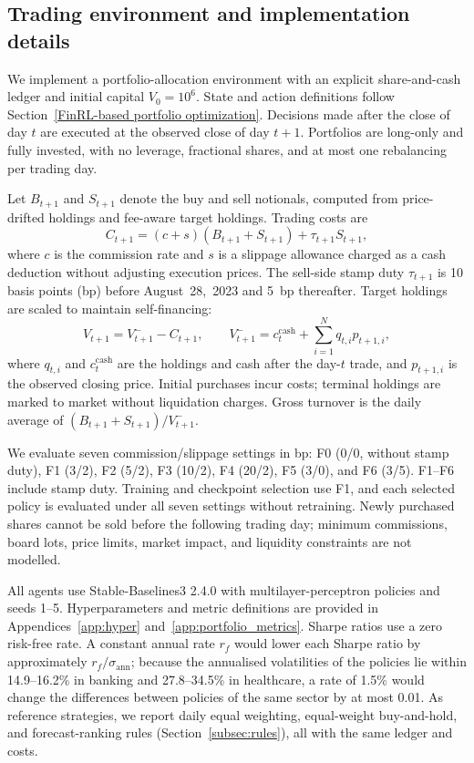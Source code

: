 \documentclass[pdflatex,sn-mathphys-num]{sn-jnl}%
\theoremstyle{thmstyleone}%
\theoremstyle{thmstyletwo}%
\theoremstyle{thmstylethree}%
\begin{document}
\subsection{Trading environment and implementation details}
\label{subsec:env}
{\color{blue}
We implement a portfolio-allocation environment with an explicit share-and-cash ledger and initial capital $V_0=10^6$. State and action definitions follow Section~\ref{FinRL-based portfolio optimization}. Decisions made after the close of day $t$ are executed at the observed close of day $t+1$. Portfolios are long-only and fully invested, with no leverage, fractional shares, and at most one rebalancing per trading day.

Let $B_{t+1}$ and $S_{t+1}$ denote the buy and sell notionals, computed from price-drifted holdings and fee-aware target holdings. Trading costs are
\begin{equation}
C_{t+1}=(c+s)(B_{t+1}+S_{t+1})+\tau_{t+1}S_{t+1},
\label{eq:trading_cost}
\end{equation}
where $c$ is the commission rate and $s$ is a slippage allowance charged as a cash deduction without adjusting execution prices. The sell-side stamp duty $\tau_{t+1}$ is 10 basis points (bp) before August~28,~2023 and 5~bp thereafter. Target holdings are scaled to maintain self-financing:
\begin{equation}
V_{t+1}=V^{-}_{t+1}-C_{t+1},
\qquad
V^{-}_{t+1}=c^{\mathrm{cash}}_t+\sum_{i=1}^{N}q_{t,i}p_{t+1,i},
\label{eq:portfolio_value_update}
\end{equation}
where $q_{t,i}$ and $c^{\mathrm{cash}}_t$ are the holdings and cash after the day-$t$ trade, and $p_{t+1,i}$ is the observed closing price. Initial purchases incur costs; terminal holdings are marked to market without liquidation charges. Gross turnover is the daily average of $(B_{t+1}+S_{t+1})/V^{-}_{t+1}$.

We evaluate seven commission/slippage settings in bp: F0 (0/0, without stamp duty), F1 (3/2), F2 (5/2), F3 (10/2), F4 (20/2), F5 (3/0), and F6 (3/5). F1--F6 include stamp duty. Training and checkpoint selection use F1, and each selected policy is evaluated under all seven settings without retraining. Newly purchased shares cannot be sold before the following trading day; minimum commissions, board lots, price limits, market impact, and liquidity constraints are not modelled.

All agents use Stable-Baselines3 2.4.0 with multilayer-perceptron policies and seeds 1--5. Hyperparameters and metric definitions are provided in Appendices~\ref{app:hyper} and~\ref{app:portfolio_metrics}. Sharpe ratios use a zero risk-free rate. A constant annual rate $r_f$ would lower each Sharpe ratio by approximately $r_f/\sigma_{\mathrm{ann}}$; because the annualised volatilities of the policies lie within 14.9--16.2\% in banking and 27.8--34.5\% in healthcare, a rate of 1.5\% would change the differences between policies of the same sector by at most 0.01. As reference strategies, we report daily equal weighting, equal-weight buy-and-hold, and forecast-ranking rules (Section~\ref{subsec:rules}), all with the same ledger and costs.
\par}
\end{document}
